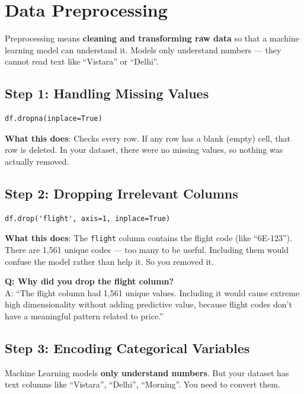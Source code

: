 \documentclass[12pt, a4paper]{article}
\begin{document}
\section{Data Preprocessing}

\begin{conceptbox}
    Preprocessing means \textbf{cleaning and transforming raw data} so that a machine learning model can understand it. Models only understand numbers — they cannot read text like ``Vistara'' or ``Delhi''.
\end{conceptbox}

\subsection{Step 1: Handling Missing Values}
\begin{lstlisting}
df.dropna(inplace=True)
\end{lstlisting}
\textbf{What this does}: Checks every row. If any row has a blank (empty) cell, that row is deleted. In your dataset, there were no missing values, so nothing was actually removed.

\subsection{Step 2: Dropping Irrelevant Columns}
\begin{lstlisting}
df.drop('flight', axis=1, inplace=True)
\end{lstlisting}
\textbf{What this does}: The \texttt{flight} column contains the flight code (like ``6E-123''). There are 1,561 unique codes — too many to be useful. Including them would confuse the model rather than help it. So you removed it.

\begin{warnbox}
    \textbf{Q: Why did you drop the flight column?} \\
    A: ``The flight column had 1,561 unique values. Including it would cause extreme high dimensionality without adding predictive value, because flight codes don't have a meaningful pattern related to price.''
\end{warnbox}

\subsection{Step 3: Encoding Categorical Variables}

Machine Learning models \textbf{only understand numbers}. But your dataset has text columns like ``Vistara'', ``Delhi'', ``Morning''. You need to convert them.
\end{document}
